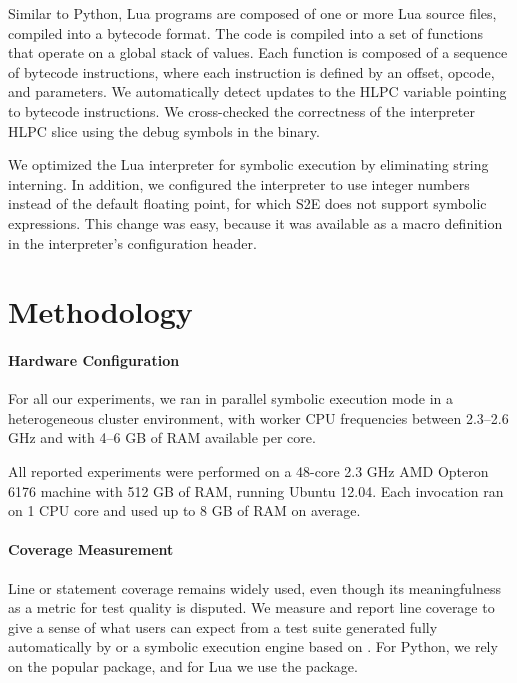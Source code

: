 Similar to Python, Lua programs are composed of one or more Lua source files, compiled into a bytecode format.  The code is compiled into a set of functions that operate on a global stack of values.  Each function is composed of a sequence of bytecode instructions, where each instruction is defined by an offset, opcode, and parameters.
%
We automatically detect updates to the HLPC variable pointing to bytecode instructions.  We cross-checked the correctness of the interpreter HLPC slice using the debug symbols in the binary.

We optimized the Lua interpreter for symbolic execution by eliminating string interning.  In addition, we configured the interpreter to use integer numbers instead of the default floating point, for which S2E does not support symbolic expressions.  This change was easy, because it was available as a macro definition in the interpreter's configuration header.


\section{Methodology}
\label{sec:eval:methodology}

\paragraph{Hardware Configuration}

For all our \cnine experiments, we ran \cnine in parallel symbolic execution mode in a heterogeneous cluster environment, with worker CPU frequencies between 2.3--2.6 GHz and with 4--6 GB of RAM available per core.

All reported \chef experiments were performed on a 48-core 2.3 GHz AMD Opteron 6176 machine with 512 GB of RAM, running Ubuntu 12.04. Each \chef invocation ran on 1 CPU core and used up to 8 GB of RAM on average.

\paragraph{Coverage Measurement}

Line or statement coverage remains widely used, even though its meaningfulness as a metric for test quality is disputed. We measure and report line coverage to give a sense of what users can expect from a test suite generated fully automatically by \cnine or a symbolic execution engine based on \chef.  For Python, we rely on the popular  package, and for Lua we use the  package.

